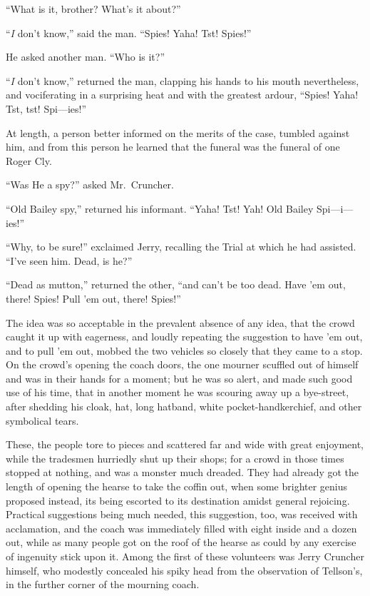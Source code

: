 ``What is it, brother?  What's it about?''

``\emph{I} don't know,'' said the man.  ``Spies!  Yaha!  Tst!  Spies!''

He asked another man.  ``Who is it?''

``\emph{I} don't know,'' returned the man, clapping his hands to his mouth
nevertheless, and vociferating in a surprising heat and with the
greatest ardour, ``Spies!  Yaha!  Tst, tst!  Spi---ies!''

At length, a person better informed on the merits of the case,
tumbled against him, and from this person he learned that the funeral
was the funeral of one Roger Cly.

``Was He a spy?'' asked Mr.\ Cruncher.

``Old Bailey spy,'' returned his informant.  ``Yaha!  Tst!  Yah!
Old Bailey Spi---i---ies!''

``Why, to be sure!'' exclaimed Jerry, recalling the Trial at which he
had assisted.  ``I've seen him.  Dead, is he?''

``Dead as mutton,'' returned the other, ``and can't be too dead.
Have 'em out, there!  Spies!  Pull 'em out, there!  Spies!''

The idea was so acceptable in the prevalent absence of any idea,
that the crowd caught it up with eagerness, and loudly repeating the
suggestion to have 'em out, and to pull 'em out, mobbed the two vehicles
so closely that they came to a stop.  On the crowd's opening the coach
doors, the one mourner scuffled out of himself and was in their hands
for a moment; but he was so alert, and made such good use of his time,
that in another moment he was scouring away up a bye-street, after
shedding his cloak, hat, long hatband, white pocket-handkerchief,
and other symbolical tears.

These, the people tore to pieces and scattered far and wide with
great enjoyment, while the tradesmen hurriedly shut up their shops;
for a crowd in those times stopped at nothing, and was a monster
much dreaded.  They had already got the length of opening the hearse
to take the coffin out, when some brighter genius proposed instead,
its being escorted to its destination amidst general rejoicing.
Practical suggestions being much needed, this suggestion, too, was
received with acclamation, and the coach was immediately filled with
eight inside and a dozen out, while as many people got on the roof of
the hearse as could by any exercise of ingenuity stick upon it.
Among the first of these volunteers was Jerry Cruncher himself, who
modestly concealed his spiky head from the observation of Tellson's,
in the further corner of the mourning coach.

